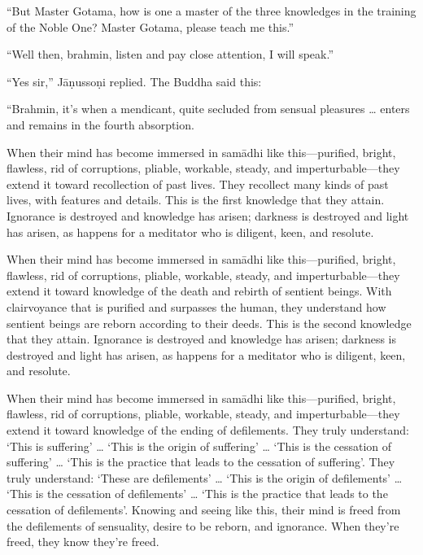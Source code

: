 \documentclass[12pt,openany]{book}%
\begin{document}
“But Master Gotama, how is one a master of the three knowledges in the training of the Noble One? Master Gotama, please teach me this.” 

“Well then, brahmin, listen and pay close attention, I will speak.” 

“Yes sir,” \textsanskrit{Jāṇussoṇi} replied. The Buddha said this: 

“Brahmin, it’s when a mendicant, quite secluded from sensual pleasures … enters and remains in the fourth absorption. 

When their mind has become immersed in \textsanskrit{samādhi} like this—purified, bright, flawless, rid of corruptions, pliable, workable, steady, and imperturbable—they extend it toward recollection of past lives. They recollect many kinds of past lives, with features and details. This is the first knowledge that they attain. Ignorance is destroyed and knowledge has arisen; darkness is destroyed and light has arisen, as happens for a meditator who is diligent, keen, and resolute. 

When their mind has become immersed in \textsanskrit{samādhi} like this—purified, bright, flawless, rid of corruptions, pliable, workable, steady, and imperturbable—they extend it toward knowledge of the death and rebirth of sentient beings. With clairvoyance that is purified and surpasses the human, they understand how sentient beings are reborn according to their deeds. This is the second knowledge that they attain. Ignorance is destroyed and knowledge has arisen; darkness is destroyed and light has arisen, as happens for a meditator who is diligent, keen, and resolute. 

When their mind has become immersed in \textsanskrit{samādhi} like this—purified, bright, flawless, rid of corruptions, pliable, workable, steady, and imperturbable—they extend it toward knowledge of the ending of defilements. They truly understand: ‘This is suffering’ … ‘This is the origin of suffering’ … ‘This is the cessation of suffering’ … ‘This is the practice that leads to the cessation of suffering’. They truly understand: ‘These are defilements’ … ‘This is the origin of defilements’ … ‘This is the cessation of defilements’ … ‘This is the practice that leads to the cessation of defilements’. Knowing and seeing like this, their mind is freed from the defilements of sensuality, desire to be reborn, and ignorance. When they’re freed, they know they’re freed. 
\end{document}
